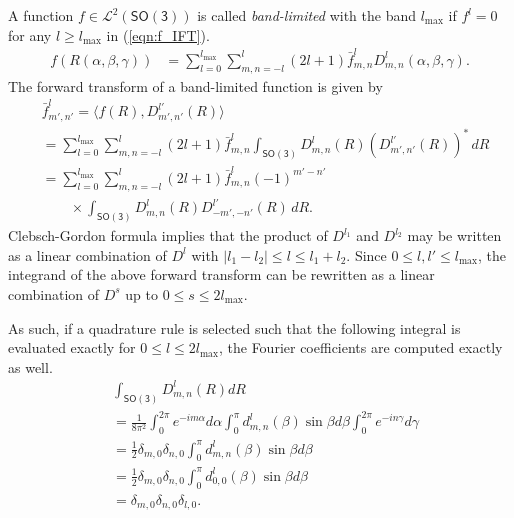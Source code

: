 \documentclass{ieeetran}
\newcommand{\pair}[1]{\ensuremath{\langle #1 \rangle}}
\newcommand{\refeqn}[1]{(\ref{eqn:#1})}
\newcommand{\SO}{\ensuremath{\mathsf{SO(3)}}}
\begin{document}
A function $f\in\mathcal{L}^2(\SO)$ is called \textit{band-limited} with the band $l_{\max}$ if $f^l=0$ for any $l\geq l_{\max}$ in \refeqn{f_IFT}.
\begin{align*}
f(R(\alpha,\beta,\gamma)) &= \sum_{l=0}^{l_{\max}} \sum_{m,n=-l}^l (2l+1)\bar f^l_{m,n} D^l_{m,n}(\alpha,\beta,\gamma).
\end{align*}
The forward transform of a band-limited function is given by
\begin{align*}
&\bar f^l_{m',n'}=\pair{ f(R), D^{l'}_{m',n'}(R)}\\
&=\sum_{l=0}^{l_{\max}} \sum_{m,n=-l}^l (2l+1)\bar f^l_{m,n} \int_{\SO}D^l_{m,n}(R)(D^{l'}_{m',n'}(R))^*\, dR\\
&=\sum_{l=0}^{l_{\max}} \sum_{m,n=-l}^l (2l+1)\bar f^l_{m,n} (-1)^{m'-n'}\nonumber\\
&\quad\quad\times\int_{\SO}D^l_{m,n}(R)D^{l'}_{-m',-n'}(R)\, dR.
\end{align*}
Clebsch-Gordon formula implies that the product of $D^{l_1}$ and $D^{l_2}$ may be written as a linear combination of $D^l$ with $|l_1-l_2|\leq l\leq l_1+l_2$. Since $0\leq l,l'\leq l_{\max}$, the integrand of the above forward transform can be rewritten as a linear combination of $D^s$ up to $0 \leq s\leq 2{l_{\max}}$. 

As such, if a quadrature rule is selected such that the following integral is evaluated exactly for $0\leq l \leq 2l_{\max}$, the Fourier coefficients are computed exactly as well. 
\begin{align}
&\int_{\SO} D^l_{m,n} (R) dR\nonumber\\
& = \frac{1}{8\pi^2} \int_0^{2\pi} e^{-im\alpha} d\alpha
\int_0^{\pi} d^l_{m,n}(\beta)\sin\beta d\beta \int_0^{2\pi} e^{-in\gamma} d\gamma\nonumber\\
& = \frac{1}{2}\delta_{m,0}\delta_{n,0} \int_0^{\pi} d^l_{m,n}(\beta)\sin\beta d\beta\nonumber\\
& = \frac{1}{2}\delta_{m,0}\delta_{n,0} \int_0^{\pi} d^l_{0,0}(\beta)\sin\beta d\beta\nonumber\\
& = \delta_{m,0}\delta_{n,0}\delta_{l,0}.\label{eqn:intD}
\end{align}
\end{document}
